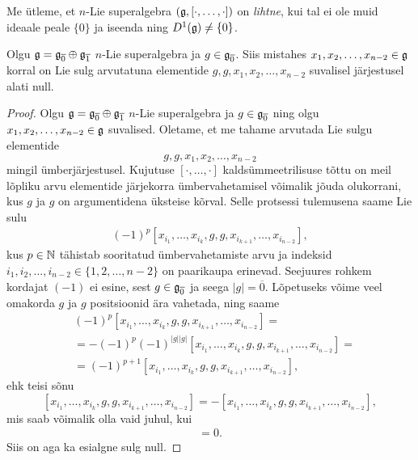 \begin{dfn}
    Me ütleme, et $n$-Lie superalgebra $(\mathfrak{g}, [\cdot, \dots, \cdot])$
    on \emph{lihtne}, kui tal ei ole muid ideaale peale $\{0\}$
    ja iseenda ning $D^1(\mathfrak{g}) \neq \{0\}$.
\end{dfn}

\begin{lemma}
    Olgu $\mathfrak{g} = \mathfrak{g}_{\overline{0}} \oplus \mathfrak{g}_{\overline{1}}$
    $n$-Lie superalgebra ja $g \in \mathfrak{g}_{\overline{0}}$. Siis
    mistahes $x_1, x_2, \dots, x_{n-2} \in \mathfrak{g}$ korral on
    Lie sulg arvutatuna elementide $g, g, x_1, x_2, \dots, x_{n-2}$
    suvalisel järjestusel alati null.
\end{lemma}

\begin{proof}
    Olgu $\mathfrak{g} = \mathfrak{g}_{\overline{0}} \oplus \mathfrak{g}_{\overline{1}}$
    $n$-Lie superalgebra ja $g \in \mathfrak{g}_{\overline{0}}$ ning olgu
    $x_1, x_2, \dots, x_{n-2} \in \mathfrak{g}$ suvalised. Oletame, et me
    tahame arvutada Lie sulgu elementide
    \[ g, g, x_1, x_2, \dots, x_{n-2} \]
    mingil ümberjärjestusel. Kujutuse $[\cdot, \dots, \cdot]$
    kaldsümmeetrilisuse tõttu on meil lõpliku arvu elementide
    järjekorra ümbervahetamisel võimalik jõuda olukorrani, kus
    $g$ ja $g$ on argumentidena üksteise kõrval. Selle protsessi
    tulemusena saame Lie sulu
    \begin{align*}
        (-1)^p [x_{i_1}, \dots, x_{i_k}, g, g,
            x_{i_{k+1}}, \dots, x_{i_{n-2}}],
    \end{align*}
    kus $p \in \mathbb{N}$ tähistab sooritatud ümbervahetamiste arvu
    ja indeksid $i_1, i_2, \dots, i_{n-2} \in \{1, 2, \dots, n-2\}$ on
    paarikaupa erinevad. Seejuures rohkem kordajat $(-1)$ ei esine,
    sest $g \in \mathfrak{g}_{\overline{0}}$ ja seega $|g| = \overline{0}$.
    Lõpetuseks võime veel omakorda $g$ ja $g$ positsioonid ära
    vahetada, ning saame
    \begin{align*}
        &(-1)^p [x_{i_1}, \dots, x_{i_k}, g, g,
            x_{i_{k+1}}, \dots, x_{i_{n-2}}] = \\
        &= -(-1)^p (-1)^{|g||g|} [x_{i_1}, \dots, 
            x_{i_k}, g, g, x_{i_{k+1}}, \dots, x_{i_{n-2}}] = \\
        &= (-1)^{p+1} [x_{i_1}, \dots, 
            x_{i_k}, g, g, x_{i_{k+1}}, \dots, x_{i_{n-2}}],
    \end{align*}
    ehk teisi sõnu
    \[
        [x_{i_1}, \dots, x_{i_k}, g, g, x_{i_{k+1}},
        \dots, x_{i_{n-2}}] = 
        -[x_{i_1}, \dots, x_{i_k}, g, g, x_{i_{k+1}},
        \dots, x_{i_{n-2}}],
    \]
    mis saab võimalik olla vaid juhul, kui
    \begin{align*}
        [x_{i_1}, \dots, x_{i_k}, g, g, x_{i_{k+1}},
        \dots, x_{i_{n-2}}] = 0.
    \end{align*}
    Siis on aga ka esialgne sulg null.
\end{proof}

